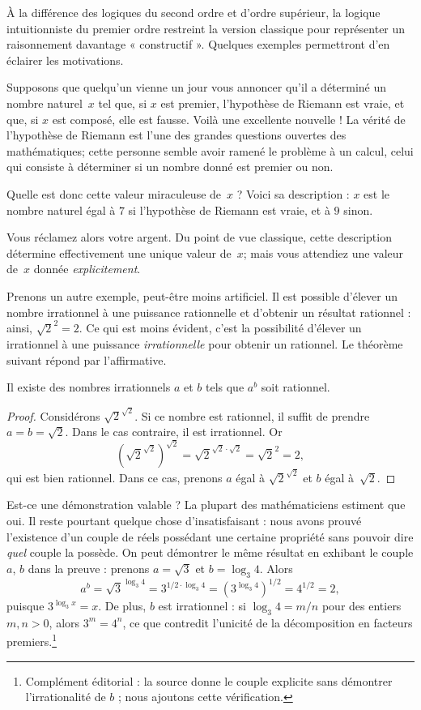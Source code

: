 \documentclass[../../../include/open-logic-section]{subfiles}
\begin{document}


À la différence des logiques du second ordre et d'ordre supérieur,
la logique intuitionniste du premier ordre restreint la version
classique pour représenter un raisonnement davantage « constructif ».
Quelques exemples permettront d'en éclairer les motivations.

Supposons que quelqu'un vienne un jour vous annoncer qu'il a
déterminé un nombre naturel~$x$ tel que, si $x$ est premier,
l'hypothèse de Riemann est vraie, et que, si $x$ est composé, elle
est fausse. Voilà une excellente nouvelle !{} La vérité de
l'hypothèse de Riemann est l'une des grandes questions ouvertes des
mathématiques; cette personne semble avoir ramené le problème à un
calcul, celui qui consiste à déterminer si un nombre donné est
premier ou non.

Quelle est donc cette valeur miraculeuse de~$x$ ? Voici sa
description : $x$ est le nombre naturel égal à $7$ si l'hypothèse de
Riemann est vraie, et à $9$ sinon.

Vous réclamez alors votre argent. Du point de vue classique, cette
description détermine effectivement une unique valeur de~$x$; mais
vous attendiez une valeur de~$x$ donnée \emph{explicitement}.

Prenons un autre exemple, peut-être moins artificiel. Il est
possible d'élever un nombre irrationnel à une puissance rationnelle
et d'obtenir un résultat rationnel : ainsi,
$\sqrt{2}^2 = 2$. Ce qui est moins évident, c'est la possibilité
d'élever un irrationnel à une puissance \emph{irrationnelle} pour
obtenir un rationnel. Le théorème suivant répond par l'affirmative.

\begin{thm}
Il existe des nombres irrationnels $a$ et $b$ tels que $a^b$ soit
rationnel.
\end{thm}

\begin{proof}
Considérons $\sqrt{2}^{\sqrt{2}}$. Si ce nombre est rationnel,
il suffit de prendre $a = b = \sqrt{2}$. Dans le cas contraire, il
est irrationnel. Or
\[
(\sqrt{2}^{\sqrt{2}})^{\sqrt{2}} = \sqrt{2}^{\sqrt{2} \cdot
  \sqrt{2}} = \sqrt{2}^2 = 2,
\]
qui est bien rationnel. Dans ce cas, prenons $a$ égal à
$\sqrt{2}^{\sqrt{2}}$ et $b$ égal à~$\sqrt 2$.
\end{proof}

Est-ce une démonstration valable ? La plupart des mathématiciens
estiment que oui. Il reste pourtant quelque chose d'insatisfaisant :
nous avons prouvé l'existence d'un couple de réels possédant une
certaine propriété sans pouvoir dire \emph{quel} couple la possède.
On peut démontrer le même résultat en exhibant le couple $a$, $b$
dans la preuve : prenons $a = \sqrt{3}$ et $b = \log_3 4$. Alors
\[
a^b = \sqrt{3}^{\log_3 4} = 3^{1/2 \cdot \log_3 4} = (3^{\log_3
  4})^{1/2} = 4^{1/2}= 2,
\]
puisque $3^{\log_3 x} = x$.
De plus, $b$ est irrationnel : si $\log_3 4 = m/n$ pour des
entiers $m,n>0$, alors $3^m = 4^n$, ce que contredit l'unicité de
la décomposition en facteurs premiers.\footnote{Complément éditorial : la source donne le couple explicite sans démontrer l'irrationalité de $b$ ; nous ajoutons cette vérification.}
\end{document}
